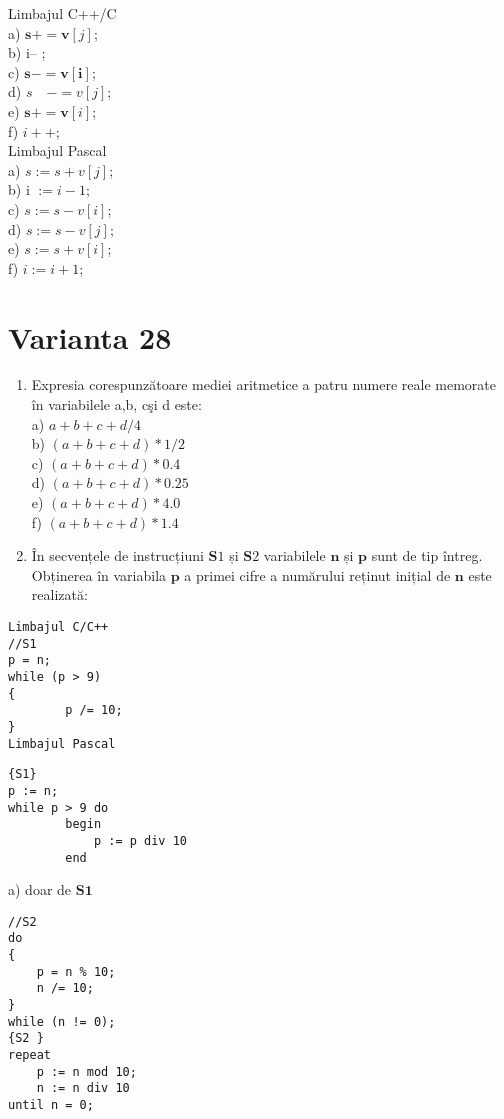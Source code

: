 Limbajul C++/C\\
a) $\mathbf{s}+=\mathbf{v}[j]$;\\
b) i-- ;\\
c) $\mathbf{s}-=\mathbf{v}[\mathbf{i}]$;\\
d) $s \quad-=v[j]$;\\
e) $\mathbf{s}+=\mathbf{v}[i]$;\\
f) $i++$;\\
Limbajul Pascal\\
a) $s:=s+v[j]$;\\
b) i $:=i-1$;\\
c) $s:=s-v[i]$;\\
d) $s:=s-v[j]$;\\
e) $s:=s+v[i]$;\\
f) $i:=i+1$;

\section*{Varianta 28}
\begin{enumerate}
  \item Expresia corespunzătoare mediei aritmetice a patru numere reale memorate în variabilele a,b, cşi d este:\\
a) $a+b+c+d / 4$\\
b) $(a+b+c+d) * 1 / 2$\\
c) $(a+b+c+d) * 0.4$\\
d) $(a+b+c+d) * 0.25$\\
e) $(a+b+c+d) * 4.0$\\
f) $(a+b+c+d) * 1.4$
  \item În secvențele de instrucțiuni $\mathbf{S} 1$ și $\mathbf{S} 2$ variabilele $\mathbf{n}$ și $\mathbf{p}$ sunt de tip întreg. Obținerea în variabila $\mathbf{p}$ a primei cifre a numărului reținut inițial de $\mathbf{n}$ este realizată:
\end{enumerate}

\begin{verbatim}
Limbajul C/C++
//S1
p = n;
while (p > 9)
{
        p /= 10;
}
Limbajul Pascal
\end{verbatim}

\begin{verbatim}
{S1}
p := n;
while p > 9 do
        begin
            p := p div 10
        end
\end{verbatim}

a) doar de $\mathbf{S 1}$

\begin{verbatim}
//S2
do
{
    p = n % 10;
    n /= 10;
}
while (n != 0);
{S2 }
repeat
    p := n mod 10;
    n := n div 10
until n = 0;
\end{verbatim}


